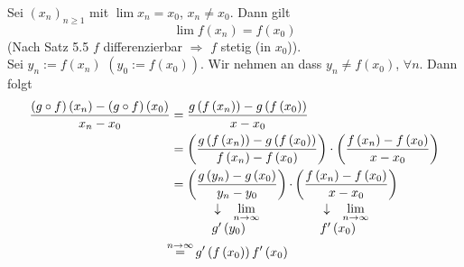 \begin{beweis}{}
Sei $\left( x_n\right)_{n\geq 1}$ mit $\lim x_n=x_0$, $x_n\not=x_0$. Dann gilt 
\[\lim f\left( x_n\right) = f\left( x_0\right)\]
(Nach Satz 5.5  $f$ differenzierbar $\Rightarrow$ $f$ stetig (in $x_0$)).\\

\noindent Sei $y_n:=f\left( x_n\right)$ $\left( y_0:=f\left( x_0\right)\right)$. Wir nehmen an dass $y_n\not=f\left( x_0\right)$, $\forall n$. Dann folgt 
\begin{align*}
\frac{{\left( {g \circ f} \right)\left( {{x_n}} \right) - \left( {g \circ f} \right)\left( {{x_0}} \right)}}{{{x_n} - {x_0}}} &= \frac{{g\left( {f\left( {{x_n}} \right)} \right) - g\left( {f\left( {{x_0}} \right)} \right)}}{{x - {x_0}}}\\
&= \left( {\frac{{g\left( {f\left( {{x_n}} \right)} \right) - g\left( {f\left( {{x_0}} \right)} \right)}}{{f\left( {{x_n}} \right) - f\left( {{x_0}} \right)}}} \right) \cdot \left( {\frac{{f\left( {{x_n}} \right) - f\left( {{x_0}} \right)}}{{x - {x_0}}}} \right)\\
& = \mathop {\left( {\frac{{g\left( {{y_n}} \right) - g\left( {{x_0}} \right)}}{{{y_n} - {y_0}}}} \right)}\limits_{\begin{array}{*{20}{c}}
{\begin{array}{*{20}{c}}
 \downarrow &{\mathop {\lim }\limits_{n \to \infty } }
\end{array}}\\
{\begin{array}{*{20}{c}}
{g'\left( {{y_0}} \right)}&{{\text{         }}}
\end{array}}
\end{array}}  \cdot \mathop {\left( {\frac{{f\left( {{x_n}} \right) - f\left( {{x_0}} \right)}}{{x - {x_0}}}} \right)}\limits_{\begin{array}{*{20}{c}}
{\begin{array}{*{20}{c}}
 \downarrow &{\mathop {\lim }\limits_{n \to \infty } }
\end{array}}\\
{\begin{array}{*{20}{c}}
{f'\left( {{x_0}} \right)}&{{\text{         }}}
\end{array}}
\end{array}} \\
&\hspace{-1.5mm}\mathop  = \limits^{n \to \infty } g'\left( {f\left( {{x_0}} \right)} \right)f'\left( {{x_0}} \right)
\end{align*}
\end{beweis}
